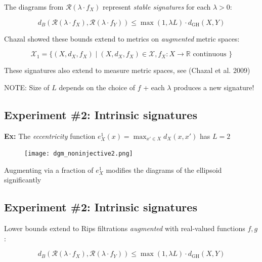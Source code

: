 \documentclass[
  letterpaper,
  DIV=11,
  numbers=noendperiod,
  oneside]{scrartcl}
\begin{document}
The diagrams from \(\mathcal{R}(\lambda \cdot f_X)\) represent
\emph{stable signatures} for each \(\lambda > 0\):

\[
d_B(\mathcal{R}(\lambda \cdot f_X), \mathcal{R}(\lambda \cdot f_Y)) \leq \max(1, \lambda L) \cdot d_{\mathrm{GH}}(X, Y)
\]

Chazal showed these bounds extend to metrics on \emph{augmented} metric
spaces:

\[
\mathcal{X}_1 = \{ (X, d_X, f_X) \mid (X, d_X, f_X) \in \mathcal{X}, f_X: X \to \mathbb{R} \text{ continuous }\}
\]

These signatures also extend to measure metric spaces, see (Chazal et
al. 2009)

{ NOTE: } Size of \(L\) depends on the choice of \(f\) + each
\(\lambda\) produces a new signature!

\hypertarget{experiment-2-intrinsic-signatures-5}{%
\subsection{Experiment \#2: Intrinsic
signatures}\label{experiment-2-intrinsic-signatures-5}}

\textbf{Ex:} The \emph{eccentricity} function
\(e_X^1(x) = \max_{x' \in X} d_X(x,x')\) has \(L = 2\)

\begin{figure}

{\centering \texttt{[image: dgm\_noninjective2.png]}

}

\end{figure}

Augmenting via a fraction of \(e_X^1\) modifies the diagrams of the
ellipsoid significantly

\hypertarget{experiment-2-intrinsic-signatures-6}{%
\subsection{Experiment \#2: Intrinsic
signatures}\label{experiment-2-intrinsic-signatures-6}}

Lower bounds extend to Rips filtrations \emph{augmented} with
real-valued functions \(f, g\):

\[
d_B(\mathcal{R}(\lambda \cdot f_X), \mathcal{R}(\lambda \cdot f_Y)) \leq \max(1, \lambda L) \cdot d_{\mathrm{GH}}(X, Y)
\]
\end{document}
